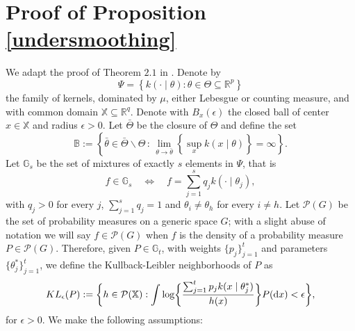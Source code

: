\documentclass[12pt]{article}
\def\log{\hbox{log}}
\begin{document}
\section{Proof of Proposition \ref{undersmoothing}}
We adapt the proof of Theorem $2.1$ in \cite{Cai2020}. Denote by
\[
\Psi = \left\{k(\cdot \mid \theta): \theta \in \Theta \subseteq \mathbb{R}^p \right\}
\]
the family of kernels, dominated by $\mu$, either Lebesgue or counting measure, and with common domain $\mathbb{X} \subseteq \mathbb{R}^q$. Denote with $B_x(\epsilon)$ the closed ball of center $x \in \mathbb{X}$ and radius $\epsilon > 0$. Let $\bar{\Theta}$ be the closure of $\Theta$ and define the set
\[
\mathbb{B} := \left\{ \bar{\theta} \in \bar{\Theta}\backslash \Theta \, : \, \lim_{\theta \to \bar{\theta}} \left \{\sup_x k(x \mid \theta)\right\} = \infty \right\}.
\]
Let $\mathbb{G}_s$ be the set of mixtures of exactly $s$ elements in $\Psi$, that is
\[
f \in \mathbb{G}_s \quad \Leftrightarrow \quad f = \sum_{j = 1}^sq_jk(\cdot \mid \theta_j),
\]
with $q_j > 0$ for every $j$, $\sum_{j = 1}^sq_j = 1$ and $\theta_i \neq \theta_h$ for every $i \neq h$.  Let $\mathcal{P}(G)$ be the set of probability measures on a generic space $G$; with a slight abuse of notation we will say $f \in \mathcal{P}(G)$ when $f$ is the density of a probability measure $P \in \mathcal{P}(G)$. Therefore, given $P \in \mathbb{G}_t$, with weights $\{p_j\}_{j = 1}^t$ and parameters $\{\theta_j^* \}_{j = 1}^t$, we define the Kullback-Leibler neighborhoods of $P$ as
\begin{equation}\label{KL_neighborhood}
KL_\epsilon(P) := \bigg\{ h \in \mathcal{P}(\mathbb{X}): \int  \log\bigg\{ \frac{\sum_{j=1}^{t} p_j k(x\mid \theta_j^\ast)}{h(x)} \bigg\} P(\mathrm{d}x)  < \epsilon \bigg\},
\end{equation}
for $\epsilon > 0$. We make the following assumptions: 
\end{document}
